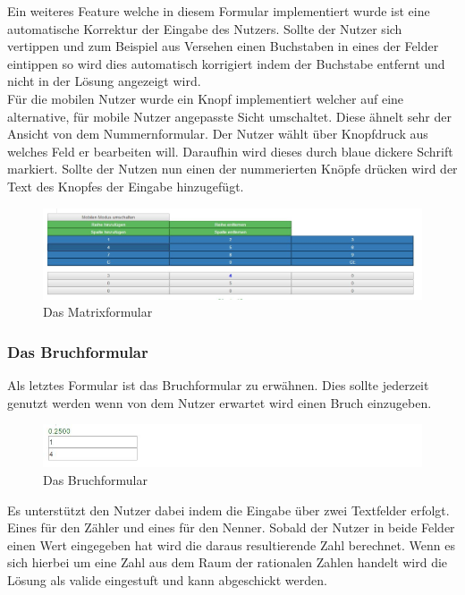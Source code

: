 Ein weiteres Feature welche in diesem Formular implementiert wurde ist eine automatische Korrektur der Eingabe des Nutzers. Sollte der Nutzer sich vertippen und zum Beispiel aus Versehen einen Buchstaben in eines der Felder eintippen so wird dies automatisch korrigiert indem der Buchstabe entfernt und nicht in der Lösung angezeigt wird. \\

Für die mobilen Nutzer wurde ein Knopf implementiert welcher auf eine alternative, für mobile Nutzer angepasste Sicht umschaltet. Diese ähnelt sehr der Ansicht von dem Nummernformular. Der Nutzer wählt über Knopfdruck aus welches Feld er bearbeiten will. Daraufhin wird dieses durch blaue dickere Schrift markiert. Sollte der Nutzen nun einen der nummerierten Knöpfe drücken wird der Text des Knopfes der Eingabe hinzugefügt.


\begin{figure}[htp]     %
\centering
\includegraphics[width=1\textwidth]{bilder/MatrixMobile} 
\caption[Das Matrixformular]{Das Matrixformular}
\end{figure} 


\subsubsection{Das Bruchformular}

Als letztes Formular ist das Bruchformular zu erwähnen. Dies sollte jederzeit genutzt werden wenn von dem Nutzer erwartet wird einen Bruch einzugeben.

\begin{figure}[htp]     %
\centering
\includegraphics[width=1\textwidth]{bilder/FractureForm} 
\caption[Das Bruchformular]{Das Bruchformular}
\end{figure} 

Es unterstützt den Nutzer dabei indem die Eingabe über zwei Textfelder erfolgt. Eines für den Zähler und eines für den Nenner. Sobald der Nutzer in beide Felder einen Wert eingegeben hat wird die daraus resultierende Zahl berechnet. Wenn es sich hierbei um eine Zahl aus dem Raum der rationalen Zahlen handelt wird die Lösung als valide eingestuft und kann abgeschickt werden.


